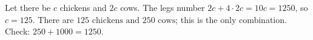 Let there be $c$ chickens and $2c$ cows. The legs number $2c+4\cdot2c=10c=1250$, so $c=125$. There are $\boxed{125\text{ chickens and }250\text{ cows}}$; this is the only combination. Check: $250+1000=1250$.
